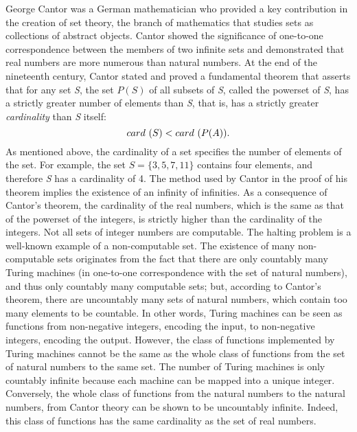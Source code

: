 George Cantor was a German mathematician who provided a key contribution in the creation of set theory, the branch of mathematics that studies sets as collections of abstract objects. Cantor showed the significance of one-to-one correspondence between the members of two infinite sets and demonstrated that real numbers are more numerous than natural numbers. At the end of the nineteenth century, Cantor stated and proved a fundamental theorem that asserts that for any set \textit{S}, the set $P(S)$ of all subsets of \textit{S}, called the powerset of \textit{S}, has a strictly greater number of elements than \textit{S}, that is, has a strictly greater \textit{cardinality} than \textit{S} itself:\vspace*{-3pt}
\[
card\ (S)<card\ (P(A)).\vspace*{-3pt}
\]
As mentioned above, the cardinality of a set specifies the number of elements of the set. For example, the set $S = \{3,5,7,11\}$ contains four elements, and therefore \textit{S} has a cardinality of 4. The method used by Cantor in the proof of his theorem implies the existence of an infinity of infinities. As a consequence of Cantor's theorem, the cardinality of the real numbers, which is the same as that of the powerset of the integers, is strictly higher than the cardinality of the integers. Not all sets of integer numbers are computable. The halting problem is a well-known example of a non-computable set. The existence of many non-computable sets originates from the fact that there are only countably many Turing machines (in one-to-one correspondence with the set of natural numbers), and thus only countably many computable sets; but, according to Cantor's theorem, there are uncountably many sets of natural numbers, which contain too many elements to be countable. In other words, Turing machines can be seen as functions from non-negative integers, encoding the input, to non-negative integers, encoding the output. However, the class of functions implemented by Turing machines cannot be the same as the whole class of functions from the set of natural numbers to the same set. The number of Turing machines is only countably infinite because each machine can be mapped into a unique integer. Conversely, the whole class of functions from the natural numbers to the natural numbers, from Cantor theory can be shown to be uncountably infinite. Indeed, this class of functions has the same cardinality as the set of real numbers.


